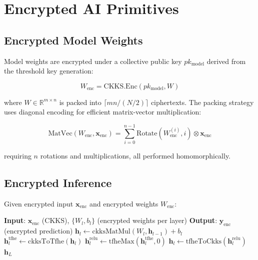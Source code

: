 \section{Encrypted AI Primitives}

\label{sec:primitives}

\subsection{Encrypted Model Weights}

Model weights are encrypted under a collective public key $pk_{\text{model}}$ derived from the threshold key generation:

\begin{equation}
W_{\text{enc}} = \text{CKKS.Enc}(pk_{\text{model}}, W)
\end{equation}

where $W \in \mathbb{R}^{m \times n}$ is packed into $\lceil mn / (N/2) \rceil$ \CKKS{} ciphertexts. The packing strategy uses diagonal encoding for efficient matrix-vector multiplication:

\begin{equation}
\text{MatVec}(W_{\text{enc}}, \mathbf{x}_{\text{enc}}) = \sum_{i=0}^{n-1} \text{Rotate}(W_{\text{enc}}^{(i)}, i) \otimes \mathbf{x}_{\text{enc}}
\end{equation}

requiring $n$ rotations and multiplications, all performed homomorphically.

\subsection{Encrypted Inference}

Given encrypted input $\mathbf{x}_{\text{enc}}$ and encrypted weights $W_{\text{enc}}$:

\begin{algorithm}[t]
\caption{Encrypted Neural Network Inference}
\label{alg:inference}
\begin{algorithmic}[1]
\STATE \textbf{Input}: $\mathbf{x}_{\text{enc}}$ (CKKS), $\{W_l, b_l\}$ (encrypted weights per layer)
\STATE \textbf{Output}: $\mathbf{y}_{\text{enc}}$ (encrypted prediction)
    \STATE $\mathbf{h}_l \leftarrow \text{ckksMatMul}(W_l, \mathbf{h}_{l-1}) + b_l$ 
        \STATE $\mathbf{h}_l^{\text{tfhe}} \leftarrow \text{ckksToTfhe}(\mathbf{h}_l)$ 
        \STATE $\mathbf{h}_l^{\text{relu}} \leftarrow \text{tfheMax}(\mathbf{h}_l^{\text{tfhe}}, 0)$ 
        \STATE $\mathbf{h}_l \leftarrow \text{tfheToCkks}(\mathbf{h}_l^{\text{relu}})$ 
    \ENDIF
\ENDFOR
\RETURN $\mathbf{h}_L$
\end{algorithmic}
\end{algorithm}

